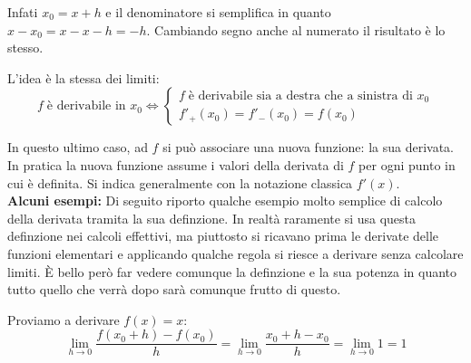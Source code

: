 Infati $x_0 = x + h$ e il denominatore si semplifica in quanto $x - x_0 = x - x - h = -h$. Cambiando segno anche al numerato il risultato è lo stesso.


L'idea è la stessa dei limiti:
\begin{equation*}
	f \; \text{è derivabile in } x_0 \iff
	\begin{cases*}
		f \; \text{è derivabile sia a destra che a sinistra di } x_0\\
		f'_+(x_0) = f'_-(x_0) = f(x_0)
	\end{cases*}
\end{equation*}

In questo ultimo caso, ad $f$ si può associare una nuova funzione: la sua derivata. In pratica la nuova funzione assume i valori della derivata di $f$ per ogni punto in cui è definita. Si indica generalmente con la notazione classica $f'(x)$.\\

\textbf{Alcuni esempi:} Di seguito riporto qualche esempio molto semplice di calcolo della derivata tramita la sua definzione. In realtà raramente si usa questa definzione nei calcoli effettivi, ma piuttosto si ricavano prima le derivate delle funzioni elementari e applicando qualche regola si riesce a derivare senza calcolare limiti. È bello però far vedere comunque la definzione e la sua potenza in quanto tutto quello che verrà dopo sarà comunque frutto di questo. %

Proviamo a derivare $f(x) = x$:
\begin{equation*}
	\lim_{h \to 0} \dfrac{f(x_0 + h) - f(x_0)}{h} = \lim_{h \to 0} \dfrac{x_0 + h -x_0}{h} = \lim_{h \to 0} 1 = 1
\end{equation*}


